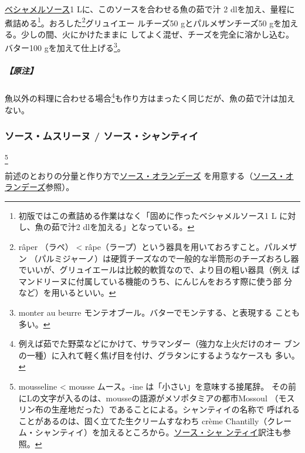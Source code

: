 \begin{recette}
\protect\hyperlink{sauce-bechamel}{ベシャメルソース}1
Lに、このソースを合わせる魚の茹で汁 2
dlを加え、\deuxtiers{}量程に煮詰める\footnote{初版ではこの煮詰める作業はなく「固めに作ったベシャメルソース1
  L に対し、魚の茹で汁2 dlを加える」となっている。}。おろした\footnote{râper
  （ラペ） \textless{}
  râpe（ラープ）という器具を用いておろすこと。パルメザン
  （パルミジャーノ）は硬質チーズなので一般的な半筒形のチーズおろし器
  でいいが、グリュイエールは比較的軟質なので、より目の粗い器具（例え
  ばマンドリーヌに付属している機能のうち、にんじんをおろす際に使う部
  分など）を用いるといい。}グリュイエー ルチーズ50 gとパルメザンチーズ50
gを加える。少しの間、火にかけたままに
してよく混ぜ、チーズを完全に溶かし込む。バター100
gを加えて仕上げる\footnote{monter au beurre
  モンテオブール。バターでモンテする、と表現する ことも多い。}。

\hypertarget{nota-sauce-mornay}{%
\subparagraph{【原注】}\label{nota-sauce-mornay}}

魚以外の料理に合わせる場合\footnote{例えば茹でた野菜などにかけて、サラマンダー（強力な上火だけのオー
  ブンの一種）に入れて軽く焦げ目を付け、グラタンにするようなケースも
  多い。}も作り方はまったく同じだが、魚の茹で汁は加えない。

\maeaki

\hypertarget{sauce-mousseline}{%
\subsubsection{ソース・ムスリーヌ /
ソース・シャンティイ}\label{sauce-mousseline}}

\footnote{mousseline
  \textless{} mousse ムース。-ine は「小さい」を意味する接尾辞。
  その前にLの文字が入るのは、mousseの語源がメソポタミアの都市Mossoul
  （モスリン布の生産地だった）であることによる。シャンティイの名称で
  呼ばれることがあるのは、固く立てた生クリームすなわち crème
  Chantilly（クレーム・シャンティイ）を加えるところから。\protect\hyperlink{sauce-chantilly}{ソース・シャ
  ンティイ}訳注も参照。}


前述のとおりの分量と作り方で\protect\hyperlink{sauce-hollandaise}{ソース・オランデーズ}
を用意する（\protect\hyperlink{sauce-hollandaise}{ソース・オランデーズ}参照）。


\end{recette}
